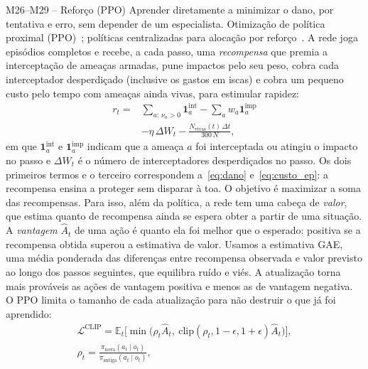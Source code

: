 \begin{metodo}{M26--M29 -- Reforço (PPO)}
\ideia Aprender diretamente a minimizar o dano, por tentativa e erro, sem depender de um especialista.
\orig Otimização de política proximal (PPO)~\cite{schulman2017}; políticas centralizadas para alocação por
reforço~\cite{liu2023drones,palmas2025,jia2026}.
\func A rede joga episódios completos e recebe, a cada passo, uma \emph{recompensa} que premia a interceptação de
ameaças armadas, pune impactos pelo seu peso, cobra cada interceptador desperdiçado (inclusive os gastos em iscas) e
cobra um pequeno custo pelo tempo com ameaças ainda vivas, para estimular rapidez:
\begin{equation}
  \begin{split}
  r_t ={}& \sum_{a:\,\nu_a>0}\mathbf{1}^{\mathrm{int}}_a - \sum_a w_a\mathbf{1}^{\mathrm{imp}}_a\\
  &- \eta\,\Delta W_t - \frac{N_{\mathrm{vivas}}(t)\,\Delta t}{300\,N},
  \end{split}
\end{equation}
em que $\mathbf{1}^{\mathrm{int}}_a$ e $\mathbf{1}^{\mathrm{imp}}_a$ indicam que a ameaça $a$ foi interceptada ou
atingiu o impacto no passo e $\Delta W_t$ é o número de interceptadores desperdiçados no passo. Os dois primeiros termos e o terceiro
correspondem a~\eqref{eq:dano} e~\eqref{eq:custo_ep}: a recompensa ensina a proteger sem disparar à toa.
O objetivo é maximizar a soma das recompensas. Para isso, além da política, a rede tem uma cabeça de \emph{valor}, que
estima quanto de recompensa ainda se espera obter a partir de uma situação. A \emph{vantagem} $\hat A_t$ de uma ação é
quanto ela foi melhor que o esperado: positiva se a recompensa obtida superou a estimativa de valor. Usamos a estimativa
GAE, uma média ponderada das diferenças entre recompensa observada e valor previsto ao longo dos passos seguintes, que
equilibra ruído e viés. A atualização torna mais prováveis as ações de vantagem positiva e menos as de vantagem negativa.
O PPO limita o tamanho de cada atualização para não destruir o que já foi aprendido:
\begin{equation}
  \begin{gathered}
  \mathcal{L}^{\mathrm{CLIP}}=\mathbb{E}_t\Big[\min\big(\rho_t\hat A_t,\ \mathrm{clip}(\rho_t,1-\epsilon,1+\epsilon)\hat A_t\big)\Big],\\
  \rho_t=\frac{\pi_{\mathrm{nova}}(a_t\mid o_t)}{\pi_{\mathrm{antiga}}(a_t\mid o_t)},
  \end{gathered}
\end{equation}

\end{metodo}
